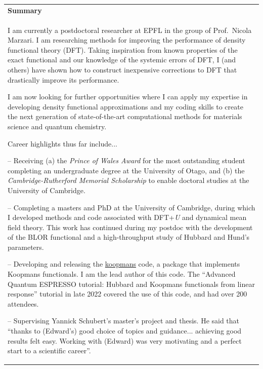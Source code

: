 \documentclass[10pt,a4paper,final]{article}
\begin{document}
\begin{tabularx}{\textwidth}{X}
   \cellcolor{seaborn_blue}\large\textbf{\textcolor{seaborn_bg_grey_half}{Summary}} \\
   I am currently a postdoctoral researcher at EPFL in the group of Prof.\ Nicola Marzari. I am researching methods for improving the performance of density functional theory (DFT). Taking inspiration from known properties of the exact functional and our knowledge of the systemic errors of DFT, I (and others) have shown how to construct inexpensive corrections to DFT that drastically improve its performance.

   \vspace{6pt}
   I am now looking for further opportunities where I can apply my expertise in developing density functional approximations and my coding skills to create the next generation of state-of-the-art computational methods for materials science and quantum chemistry.
   
   \vspace{6pt}
   Career highlights thus far include...
   \vspace{6pt}

   -- Receiving (a) the \textit{Prince of Wales Award} for the most outstanding student completing an undergraduate degree at the University of Otago, and (b) the \textit{Cambridge-Rutherford Memorial Scholarship} to enable doctoral studies at the University of Cambridge.
   \vspace{6pt}

   -- Completing a masters and PhD at the University of Cambridge, during which I developed methods and code associated with DFT+\emph{U} and dynamical mean field theory.
    This work has continued during my postdoc with the development of the BLOR functional and a high-throughput study of Hubbard and Hund's parameters.
   \vspace{6pt}

   -- Developing and releasing the \href{https://koopmans-functionals.org/}{koopmans} code, a package that implements Koopmans functionals. I am the lead author of this code. The ``Advanced Quantum ESPRESSO tutorial: Hubbard and Koopmans functionals from linear response'' tutorial in late 2022 covered the use of this code, and had over 200 attendees. %
   \vspace{6pt}

   -- Supervising Yannick Schubert's master's project and thesis. He said that ``thanks to (Edward's) good choice of topics and guidance... achieving good results felt easy. Working with (Edward) was very motivating and a perfect start to a scientific career''.
   \vspace{6pt}
\end{tabularx}%
\setlength{\fboxsep}{5pt}%
\setlength{\fboxrule}{0pt}%
\end{document}
